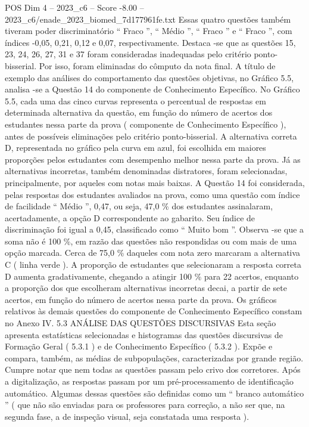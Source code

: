 \begin{textsample}{POS Dim 4 – 2023\_c6 – Score -8.00 – 2023\_c6/enade\_2023\_biomed\_7d177961fe.txt}
Essas quatro questões também tiveram poder discriminatório “ Fraco ”, “ Médio ”, “ Fraco ” e “ Fraco ”, com índices -0,05, 0,21, 0,12 e 0,07, respectivamente.
Destaca -se que as questões 15, 23, 24, 26, 27, 31 e 37 foram consideradas inadequadas pelo critério ponto-bisserial.
Por isso, foram eliminadas do cômputo da nota final.
A título de exemplo das análises do comportamento das questões objetivas, no Gráfico 5.5, analisa -se a Questão 14 do componente de Conhecimento Específico.
No Gráfico 5.5, cada uma das cinco curvas representa o percentual de respostas em determinada alternativa da questão, em função do número de acertos dos estudantes nessa parte da prova ( componente de Conhecimento Específico ), antes de possíveis eliminações pelo critério ponto-bisserial.
A alternativa correta D, representada no gráfico pela curva em azul, foi escolhida em maiores proporções pelos estudantes com desempenho melhor nessa parte da prova.
Já as alternativas incorretas, também denominadas distratores, foram selecionadas, principalmente, por aqueles com notas mais baixas.
A Questão 14 foi considerada, pelas respostas dos estudantes avaliados na prova, como uma questão com índice de facilidade “ Médio ”, 0,47, ou seja, 47,0 \% dos estudantes assinalaram, acertadamente, a opção D correspondente ao gabarito.
Seu índice de discriminação foi igual a 0,45, classificado como “ Muito bom ”.
Observa -se que a soma não é 100 \%, em razão das questões não respondidas ou com mais de uma opção marcada.
Cerca de 75,0 \% daqueles com nota zero marcaram a alternativa C ( linha verde ).
A proporção de estudantes que selecionaram a resposta correta D aumenta gradativamente, chegando a atingir 100 \% para 22 acertos, enquanto a proporção dos que escolheram alternativas incorretas decai, a partir de sete acertos, em função do número de acertos nessa parte da prova.
Os gráficos relativos às demais questões do componente de Conhecimento Específico constam no Anexo IV. 5.3 ANÁLISE DAS QUESTÕES DISCURSIVAS Esta seção apresenta estatísticas selecionadas e histogramas das questões discursivas de Formação Geral ( 5.3.1 ) e de Conhecimento Específico ( 5.3.2 ).
Expõe e compara, também, as médias de subpopulações, caracterizadas por grande região.
Cumpre notar que nem todas as questões passam pelo crivo dos corretores.
Após a digitalização, as respostas passam por um pré-processamento de identificação automático.
Algumas dessas questões são definidas como um “ branco automático ” ( que não são enviadas para os professores para correção, a não ser que, na segunda fase, a de inspeção visual, seja constatada uma resposta ).

\end{textsample}
